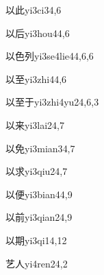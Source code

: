 \begin{verbete}{以此}{yi3ci3}{4,6}
\end{verbete}

\begin{verbete}{以后}{yi3hou4}{4,6}
\end{verbete}

\begin{verbete}{以色列}{yi3se4lie4}{4,6,6}
\end{verbete}

\begin{verbete}{以至}{yi3zhi4}{4,6}
\end{verbete}

\begin{verbete}{以至于}{yi3zhi4yu2}{4,6,3}
\end{verbete}

\begin{verbete}{以来}{yi3lai2}{4,7}
\end{verbete}

\begin{verbete}{以免}{yi3mian3}{4,7}
\end{verbete}

\begin{verbete}{以求}{yi3qiu2}{4,7}
\end{verbete}

\begin{verbete}{以便}{yi3bian4}{4,9}
\end{verbete}

\begin{verbete}{以前}{yi3qian2}{4,9}
\end{verbete}

\begin{verbete}{以期}{yi3qi1}{4,12}
\end{verbete}

\begin{verbete}{艺人}{yi4ren2}{4,2}
\end{verbete}

